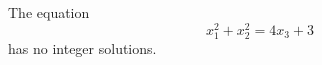 \begin{proposition}
    The equation
\[
    x_1^2+x_2^2=4x_3+3
\]
    has no integer solutions.
\end{proposition}
